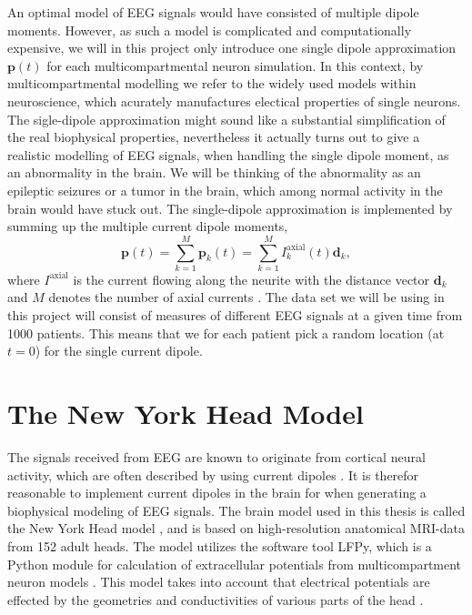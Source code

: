 \documentclass[a4paper, UKenglish, 11pt]{uiomaster}
\begin{document}
An optimal model of EEG signals would have consisted of multiple dipole moments. However, as such a model is complicated and computationally expensive, we will in this project only introduce one single dipole approximation $\textbf{p}(t)$ for each multicompartmental neuron simulation. In this context, by  multicompartmental modelling we refer to the widely used models within neuroscience, which acurately manufactures electical properties of single neurons. The sigle-dipole approximation might sound like a substantial simplification of the real biophysical properties, nevertheless it actually turns out to give a realistic modelling of EEG signals, when handling the single dipole moment, as an abnormality in the brain. We will be thinking of the abnormality as an epileptic seizures or a tumor in the brain, which among normal activity in the brain would have stuck out. The single-dipole approximation is implemented by summing up the multiple current dipole moments,
\begin{equation*}
    \textbf{p}(t) = \sum_{k=1}^M \textbf{p}_k(t) = \sum_{k=1}^M I_k^{\text{axial}}(t)\textbf{d}_k,
\end{equation*}
where $I^{\text{axial}}$ is the current flowing along the neurite with the distance vector $\textbf{d}_k$ and $M$ denotes the number of axial currents \cite{95}. The data set we will be using in this project will consist of measures of different EEG signals at a given time from 1000 patients. This means that we for each patient pick a random location (at $t=0$) for the single current dipole.

\section{The New York Head Model}
The signals received from EEG are known to originate from cortical neural activity, which are often described by using current dipoles \cite{95}. It is therefor reasonable to implement current dipoles in the brain for when generating a biophysical modeling of EEG signals. The brain model used in this thesis is called the New York Head model \cite{96}, and is based on high-resolution anatomical MRI-data from 152 adult heads. The model utilizes the software tool LFPy, which is a Python module for calculation of extracellular potentials from multicompartment neuron models \cite{100}. This model takes into account that electrical potentials are effected by the geometries and conductivities of various parts of the head \cite{95}.
\end{document}
